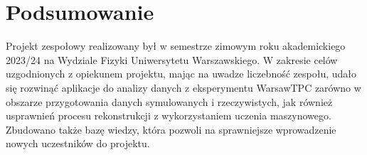 \documentclass{article}
\begin{document}
\section{Podsumowanie}
Projekt zespołowy realizowany był w semestrze zimowym roku akademickiego 2023/24 na Wydziale Fizyki Uniwersytetu Warszawskiego. W zakresie celów uzgodnionych z opiekunem projektu, mając na uwadze liczebność zespołu, udało się rozwinąć aplikacje do analizy danych z eksperymentu WarsawTPC zarówno w obszarze przygotowania danych symulowanych i rzeczywistych, jak również usprawnień procesu rekonstrukcji z wykorzystaniem uczenia maszynowego. Zbudowano także bazę wiedzy, która pozwoli na sprawniejsze wprowadzenie nowych uczestników do projektu. 

\setcounter{biburllcpenalty}{7}
\setcounter{biburlucpenalty}{8}

\printbibliography[title=Bibliografia]
\end{document}
